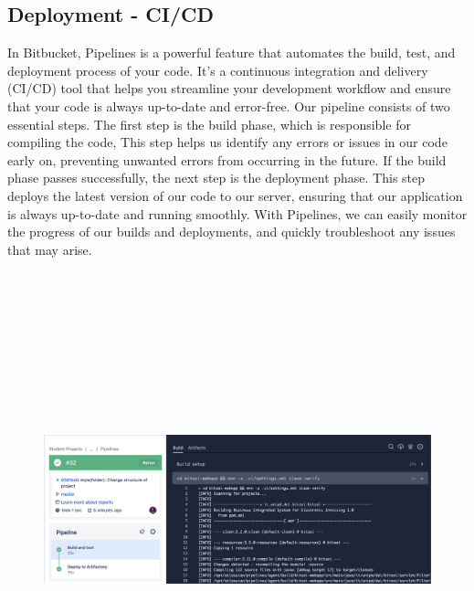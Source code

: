 \subsection{Deployment - CI/CD}\label{subsec:deployment---ci/cd}
In Bitbucket, Pipelines is a powerful feature that automates the build, test, and deployment process of your code.
It's a continuous integration and delivery (CI/CD) tool that helps you streamline your development workflow and ensure that your code is always up-to-date and error-free.
Our pipeline consists of two essential steps.
The first step is the build phase, which is responsible for compiling the code, This step helps us identify any errors or issues in our code early on, preventing unwanted errors from occurring in the future.
If the build phase passes successfully, the next step is the deployment phase.
This step deploys the latest version of our code to our server, ensuring that our application is always up-to-date and running smoothly.
With Pipelines, we can easily monitor the progress of our builds and deployments, and quickly troubleshoot any issues that may arise.

\begin{figure}[h!]
    \centering
    \includegraphics[height=390pt, keepaspectratio]{resources/pipeline.png}\label{fig:bitbucket-pipeline}
\end{figure}
